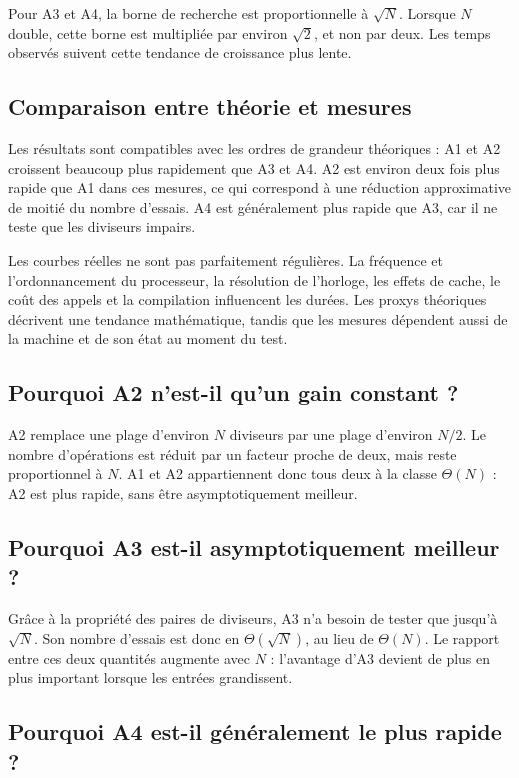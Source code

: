 \documentclass[11pt,a4paper]{article}
\begin{document}
Pour A3 et A4, la borne de recherche est proportionnelle à $\sqrt{N}$. Lorsque $N$ double, cette borne est multipliée par environ $\sqrt{2}$, et non par deux. Les temps observés suivent cette tendance de croissance plus lente.

\subsection{Comparaison entre théorie et mesures}

Les résultats sont compatibles avec les ordres de grandeur théoriques : A1 et A2 croissent beaucoup plus rapidement que A3 et A4. A2 est environ deux fois plus rapide que A1 dans ces mesures, ce qui correspond à une réduction approximative de moitié du nombre d'essais. A4 est généralement plus rapide que A3, car il ne teste que les diviseurs impairs.

Les courbes réelles ne sont pas parfaitement régulières. La fréquence et l'ordonnancement du processeur, la résolution de l'horloge, les effets de cache, le coût des appels et la compilation influencent les durées. Les proxys théoriques décrivent une tendance mathématique, tandis que les mesures dépendent aussi de la machine et de son état au moment du test.

\subsection{Pourquoi A2 n'est-il qu'un gain constant ?}

A2 remplace une plage d'environ $N$ diviseurs par une plage d'environ $N/2$. Le nombre d'opérations est réduit par un facteur proche de deux, mais reste proportionnel à $N$. A1 et A2 appartiennent donc tous deux à la classe $\Theta(N)$ : A2 est plus rapide, sans être asymptotiquement meilleur.

\subsection{Pourquoi A3 est-il asymptotiquement meilleur ?}

Grâce à la propriété des paires de diviseurs, A3 n'a besoin de tester que jusqu'à $\sqrt{N}$. Son nombre d'essais est donc en $\Theta(\sqrt{N})$, au lieu de $\Theta(N)$. Le rapport entre ces deux quantités augmente avec $N$ : l'avantage d'A3 devient de plus en plus important lorsque les entrées grandissent.

\subsection{Pourquoi A4 est-il généralement le plus rapide ?}
\end{document}
